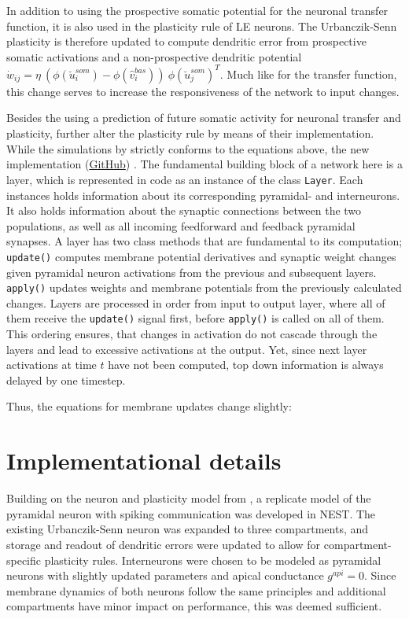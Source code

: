 In addition to using the prospective somatic potential for the neuronal transfer function, it is also used in the
plasticity rule of LE neurons. The Urbanczik-Senn plasticity is therefore updated to compute dendritic error from
prospective somatic activations and a non-prospective dendritic potential $\dot{w}_{ij}= \eta \ (
\phi(\breve{u}_i^{som}) - \phi(\hat{v}_i^{bas}) ) \ \phi(\breve{u}_j^{som})^T$. Much like for the transfer function,
this change serves to increase the responsiveness of the network to input changes. \newline


Besides the using a prediction of future somatic activity for neuronal transfer and plasticity, \cite{Haider2021}
further alter the plasticity rule by means of their implementation. While the simulations by
\cite{sacramento2018dendritic} strictly conforms to the equations above, the new implementation
(\href{https://github.com/neurips}{GitHub}) . The fundamental building block of a network here is a layer, which is
represented in code as an instance of the class \texttt{Layer}. Each instances holds information about its corresponding
pyramidal- and interneurons. It also holds information about the synaptic connections between the two populations, as
well as all incoming feedforward and feedback pyramidal synapses. A layer has two class methods that are fundamental to
its computation; \texttt{update()} computes membrane potential derivatives and synaptic weight changes given pyramidal
neuron activations from the previous and subsequent layers. \texttt{apply()} updates weights and membrane potentials
from the previously calculated changes. Layers are processed in order from input to output layer, where all of them
receive the \texttt{update()} signal first, before \texttt{apply()} is called on all of them. This ordering ensures,
that changes in activation do not cascade through the layers and lead to excessive activations at the output. Yet, since
next layer activations at time $t$ have not been computed, top down information is always delayed by one timestep.


Thus, the equations for membrane updates change slightly:

\section{Implementational details}

Building on the neuron and plasticity model from \cite{Stapmanns2021}, a replicate model of the pyramidal neuron with
spiking communication was developed in NEST. The existing Urbanczik-Senn neuron was expanded to three compartments, and
storage and readout of dendritic errors were updated  to allow for compartment-specific plasticity rules. Interneurons
were chosen to be modeled as pyramidal neurons with slightly updated parameters and apical conductance $g^{api}=0$.
Since membrane dynamics of both neurons follow the same principles and additional compartments have minor impact on
performance, this was deemed sufficient.  

